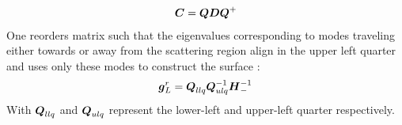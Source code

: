 \begin{align}
\boldsymbol{C} = \boldsymbol{Q}\boldsymbol{D}\boldsymbol{Q}^+
\label{eqn:schurdecomposition}
\end{align}
One reorders matrix  such that the eigenvalues corresponding to modes traveling either towards or away from the scattering region align in the upper left quarter and uses only these modes to construct the surface \gfnc{}:
\begin{align}
\boldsymbol{g}^r_L = \boldsymbol{Q}_{llq}\boldsymbol{Q}_{ulq}^{-1}\boldsymbol{H}_{-}^{-1}
\end{align}
With $\boldsymbol{Q}_{llq}$ and $\boldsymbol{Q}_{ulq}$ represent the lower-left and upper-left quarter respectively. 
